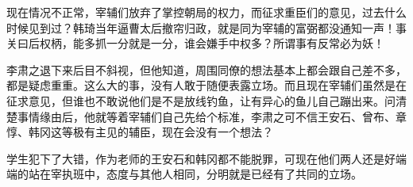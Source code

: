 现在情况不正常，宰辅们放弃了掌控朝局的权力，而征求重臣们的意见，过去什么时候见到过？韩琦当年逼曹太后撤帘归政，就是同为宰辅的富弼都没通知一声！事关曰后权柄，能多抓一分就是一分，谁会嫌手中权多？所谓事有反常必为妖！

李肃之退下来后目不斜视，但他知道，周围同僚的想法基本上都会跟自己差不多，都是疑虑重重。这么大的事，没有人敢于随便表露立场。而且现在宰辅们虽然是在征求意见，但谁也不敢说他们是不是放线钓鱼，让有异心的鱼儿自己蹦出来。问清楚事情缘由后，他就等着宰辅们自己先给个标准，李肃之可不信王安石、曾布、章惇、韩冈这等极有主见的辅臣，现在会没有一个想法？

学生犯下了大错，作为老师的王安石和韩冈都不能脱罪，可现在他们两人还是好端端的站在宰执班中，态度与其他人相同，分明就是已经有了共同的立场。

